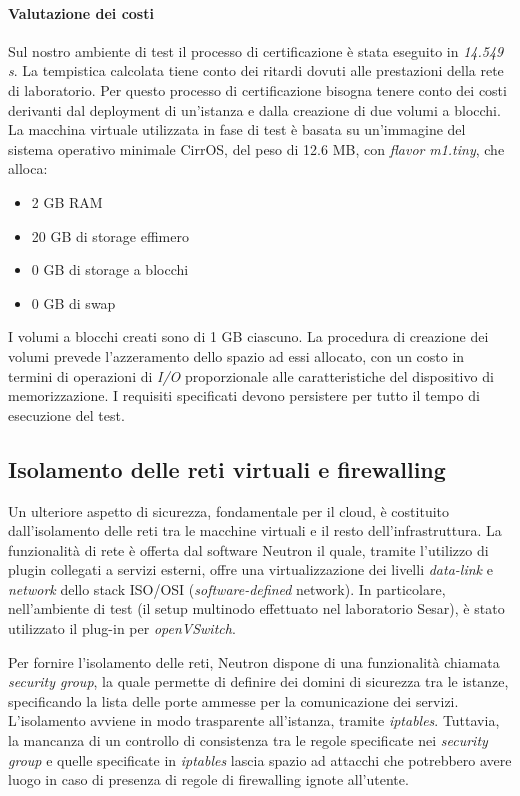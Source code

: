 \documentclass[../main.tex]{subfiles}
\begin{document}
\paragraph{Valutazione dei costi}
Sul nostro ambiente di test il processo di certificazione è stata eseguito in \textit{14.549 s}. La tempistica calcolata tiene conto dei ritardi dovuti alle prestazioni della rete di laboratorio.
Per questo processo di certificazione bisogna tenere conto dei costi derivanti dal deployment di un'istanza e dalla creazione di due volumi a blocchi.
La macchina virtuale utilizzata in fase di test è basata su un'immagine del sistema operativo minimale CirrOS, del peso di 12.6 MB, con \textit{flavor} \textit{m1.tiny}, che alloca:
\begin{itemize}
\item 2 GB RAM
\item 20 GB di storage effimero
\item 0 GB di storage a blocchi
\item 0 GB di swap
\end{itemize}

I volumi a blocchi creati sono di 1 GB ciascuno. La procedura di creazione dei volumi prevede l'azzeramento dello spazio ad essi allocato, con un costo in termini di operazioni di \textit{I/O} proporzionale alle caratteristiche del dispositivo di memorizzazione.
I requisiti specificati devono persistere per tutto il tempo di esecuzione del test.

\subsection{Isolamento delle reti virtuali e firewalling}
Un ulteriore aspetto di sicurezza, fondamentale per il cloud, è costituito dall'isolamento delle reti tra le macchine virtuali e il resto dell'infrastruttura.
La funzionalità di rete è offerta dal software Neutron il quale, tramite l'utilizzo di plugin collegati a servizi esterni, offre una virtualizzazione dei livelli \textit{data-link} e \textit{network} dello stack ISO/OSI (\textit{software-defined} network).
In particolare, nell'ambiente di test (il setup multinodo effettuato nel laboratorio Sesar), è stato utilizzato il plug-in per \textit{openVSwitch}.

Per fornire l'isolamento delle reti, Neutron dispone di una funzionalità chiamata \textit{security group}, la quale permette di definire dei domini di sicurezza tra le istanze, specificando la lista delle porte ammesse per la comunicazione dei servizi.
L'isolamento avviene in modo trasparente all'istanza, tramite \textit{iptables}. Tuttavia, la mancanza di un controllo di consistenza tra le regole specificate nei \textit{security group} e quelle specificate in \textit{iptables} lascia spazio ad attacchi che potrebbero avere luogo in caso di presenza di regole di firewalling ignote all'utente.
\end{document}
